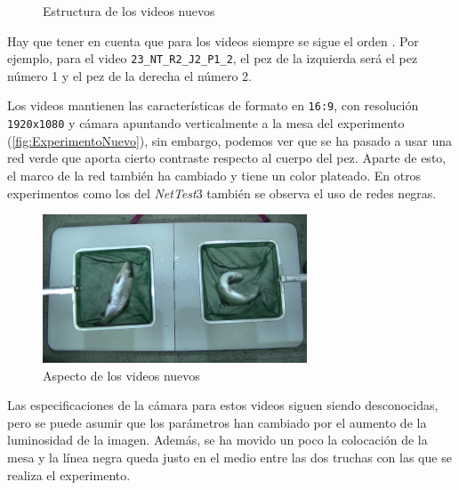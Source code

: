 \begin{figure}[h]
    \centering
    \begin{subfigure}[b]{0.5\textwidth}
    \end{subfigure}
    \caption{Estructura de los  videos nuevos}
    \label{fig:EstrucutraNuevos}
\end{figure}

Hay que tener en cuenta que para los videos siempre se sigue el orden \textit{}. Por ejemplo, para el video \verb|23_NT_R2_J2_P1_2|, el pez de la izquierda será el pez número 1 y 
el pez de la derecha el número 2.

Los videos mantienen las características de formato en \texttt{16:9}, con resolución \texttt{1920x1080} y cámara apuntando verticalmente a la mesa del experimento 
(\autoref{fig:ExperimentoNuevo}), sin embargo, podemos ver que se ha pasado a usar una red verde que aporta cierto contraste respecto al cuerpo del pez. Aparte de esto, 
el marco de la red también ha cambiado y tiene un color plateado. En otros experimentos como los del \textit{NetTest}3 también se observa el uso de redes negras.

\begin{figure}[H]
    \centering
    \includegraphics[width=0.7\textwidth]{images/3/ExperimentoNuevo.png}
    \caption{Aspecto de los videos nuevos}
    \label{fig:ExperimentoNuevo}
\end{figure}

Las especificaciones de la cámara para estos videos siguen siendo desconocidas, pero se puede asumir que los parámetros han cambiado por el aumento de la luminosidad de la imagen.
Además, se ha movido un poco la colocación de la mesa y la línea negra queda justo en el medio entre las dos truchas con las que se realiza el experimento.

